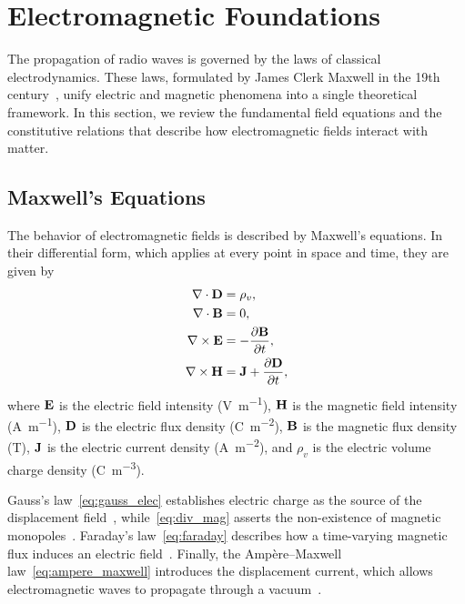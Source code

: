 \section{Electromagnetic Foundations}

The propagation of radio waves is governed by the laws of classical electrodynamics. These laws, formulated by James Clerk Maxwell in the 19th century~, unify electric and magnetic phenomena into a single theoretical framework. In this section, we review the fundamental field equations and the constitutive relations that describe how electromagnetic fields interact with matter.

\subsection{Maxwell's Equations}

The behavior of electromagnetic fields is described by Maxwell's equations. In their differential form, which applies at every point in space and time, they are given by
\begin{align}
  \nabla \cdot \mathbf{D} &= \rho_v \label{eq:gauss_elec},\\
  \nabla \cdot \mathbf{B} &= 0 \label{eq:div_mag},\\
  \nabla \times \mathbf{E} &= -\frac{\partial \mathbf{B}}{\partial t} \label{eq:faraday},\\
  \nabla \times \mathbf{H} &= \mathbf{J} + \frac{\partial \mathbf{D}}{\partial t}\label{eq:ampere_maxwell},
\end{align}
where $\mathbf{E}$ is the electric field intensity (\unit{\volt\per\meter}), $\mathbf{H}$ is the magnetic field intensity (\unit{\ampere\per\meter}), $\mathbf{D}$ is the electric flux density (\unit{\coulomb\per\meter\squared}), $\mathbf{B}$ is the magnetic flux density (\unit{\tesla}), $\mathbf{J}$ is the electric current density (\unit{\ampere\per\meter\squared}), and $\rho_v$ is the electric volume charge density (\unit{\coulomb\per\meter\cubed}).

Gauss's law~\eqref{eq:gauss_elec} establishes electric charge as the source of the displacement field~, while~\eqref{eq:div_mag} asserts the non-existence of magnetic monopoles~. Faraday's law~\eqref{eq:faraday} describes how a time-varying magnetic flux induces an electric field~. Finally, the Ampère--Maxwell law~\eqref{eq:ampere_maxwell} introduces the displacement current, which allows electromagnetic waves to propagate through a vacuum~.


